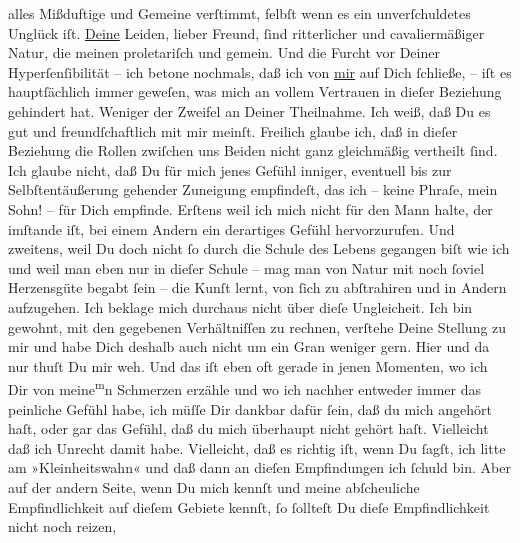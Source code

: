\begin{ledgroupsized}[t]{13cm}
               alles Mißduftige und Gemeine verſtimmt, \strikeout{\textcolor{gray}{ſelbst}} felbſt wenn es ein unverſchuldetes Unglück iſt. \uline{Deine} Leiden, lieber Freund, ſind ritterlicher und cavaliermäßiger Natur,
               die meinen proletariſch und gemein. Und {\pb}die Furcht
               vor Deiner Hyperſenſibilität – ich betone nochmals, daß ich von \uline{mir} auf Dich ſchließe, – iſt es hauptſächlich immer
               geweſen, was mich an vollem Vertrauen in dieſer Beziehung gehindert hat. Weniger der
               Zweifel an Deiner Theilnahme. Ich weiß, daß Du es gut und freundſchaftlich mit mir
               meinſt. Freilich glaube ich, daß in dieſer Beziehung die Rollen zwiſchen uns Beiden
               nicht ganz gleichmäßig vertheilt ſind. Ich glaube nicht, daß Du für mich jenes Gefühl
               inniger, eventuell bis zur Selbſtentäußerung gehender Zuneigung empfindeſt, das ich –
               keine Phraſe, mein Sohn! – für Dich empfinde. Erſtens weil ich mich nicht für den
               Mann halte, der imſtande iſt, bei einem Andern  ein derartiges Gefühl hervorzurufen. {\pb}Und
               zweitens, weil Du doch nicht ſo durch die Schule des Lebens gegangen biſt wie ich und
               weil man eben nur in dieſer Schule – mag man von Natur mit noch ſoviel Herzensgüte
               begabt ſein – die Kunſt lernt, von ſich zu abſtrahiren und in Andern aufzugehen. Ich
               beklage mich durchaus nicht über dieſe Ungleicheit. Ich bin gewohnt, mit den
               gegebenen Verhältniſſen zu rechnen, verſtehe Deine Stellung zu mir und habe Dich
               deshalb auch nicht um ein\strikeout{\textcolor{gray}{en}} Gran weniger {\pb}gern. Hier und da nur thuſt Du
               mir weh. Und das iſt eben oft gerade in jenen Momenten,  wo ich Dir von meine\substVorne{}\textsuperscript{m}\substDazwischen{}n\substHinten{} Schmerzen erzähle und wo ich nachher entweder immer das peinliche Gefühl
               habe, ich müſſe Dir dankbar dafür ſein, daß du mich angehört haſt, oder gar das
               Gefühl, daß du mich überhaupt nicht gehört haſt. Vielleicht daß ich Unrecht damit
               habe. Vielleicht, daß es richtig iſt, wenn Du ſagſt, ich litte am »Kleinheitswahn«
               und daß dann an dieſen Empfindungen ich ſchuld bin. Aber auf der andern Seite, wenn
               Du mich kennſt und meine abſcheuliche Empfindlichkeit auf dieſem Gebiete kennſt, ſo
               ſollteſt Du dieſe Empfindlichkeit nicht noch reizen, 
\end{ledgroupsized}
